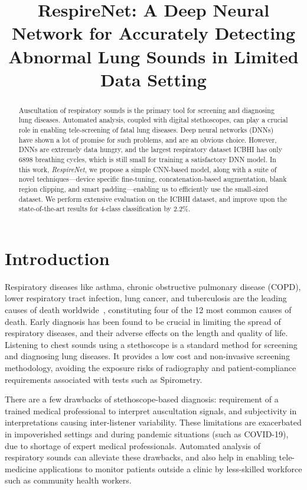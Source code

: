 \documentclass{article}
\title{RespireNet: A Deep Neural Network for Accurately Detecting Abnormal Lung Sounds in Limited Data Setting
}
\newcommand{\method}{\textit{RespireNet}}
\begin{document}
\maketitle
\begin{abstract}

Auscultation of respiratory sounds is the primary tool for screening and diagnosing lung diseases. Automated analysis, coupled with digital stethoscopes, can play a crucial role in enabling tele-screening of fatal lung diseases. Deep neural networks (DNNs) have shown a lot of promise for such problems, and are an obvious choice. However, DNNs are extremely data hungry, and the largest respiratory dataset ICBHI \citep{icbhi_17} has only 6898 breathing cycles, which is still small for training a satisfactory DNN model. In this work, \method{}, we propose a simple CNN-based model, along with a suite of novel techniques---device specific fine-tuning, concatenation-based augmentation, blank region clipping, and smart padding---enabling us to efficiently use the small-sized dataset. 
We perform extensive evaluation on the ICBHI dataset, and improve upon the state-of-the-art results for 4-class classification by 2.2\%.

\end{abstract} \vspace{-2mm}
\section{Introduction}
\label{sec:introduction}
Respiratory diseases like asthma, chronic obstructive pulmonary disease (COPD), lower respiratory tract infection, lung cancer, and tuberculosis are the leading causes of death worldwide~\cite{who_17}, constituting four of the 12 most common causes of death.
Early diagnosis has been found to be crucial in limiting the spread of respiratory diseases, and their adverse effects on the length and quality of life.
Listening to chest sounds using a stethoscope is a standard method for screening and diagnosing lung diseases.
It provides a low cost and non-invasive screening methodology, avoiding the exposure risks of radiography and patient-compliance requirements associated with tests such as Spirometry. 

There are a few drawbacks of stethoscope-based diagnosis:
requirement of a trained medical professional to interpret auscultation signals, and subjectivity in interpretations causing  inter-listener variability.
These limitations are exacerbated in impoverished settings and during pandemic situations (such as COVID-19), due to shortage of expert medical professionals.
Automated analysis of respiratory sounds can alleviate these drawbacks, and also help in enabling tele-medicine applications to monitor patients outside a clinic by less-skilled workforce such as community health workers.
\end{document}
